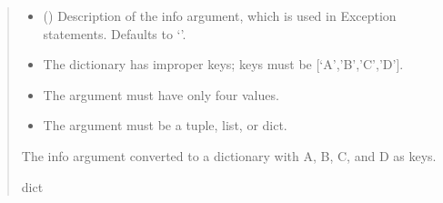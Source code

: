 \documentclass[letterpaper,10pt,english]{sphinxmanual}
\begin{document}
\begin{fulllineitems}
\begin{fulllineitems}
\begin{quote}
\begin{description}
\begin{itemize}
\item {} 
\sphinxAtStartPar
{} (\sphinxstyleliteralemphasis{\sphinxupquote{, }}) \textendash{} Description of the info argument, which is used in                 Exception statements. Defaults to ‘’.

\end{itemize}

\begin{itemize}
\item {} 
\sphinxAtStartPar
{} \textendash{} The dictionary has improper keys; keys must be {[}‘A’,’B’,’C’,’D’{]}.

\item {} 
\sphinxAtStartPar
{} \textendash{} The argument must have only four values.

\item {} 
\sphinxAtStartPar
{} \textendash{} The argument must be a tuple, list, or dict.

\end{itemize}

\sphinxAtStartPar
The info argument converted to a dictionary with A, B, C, and D as keys.

\sphinxAtStartPar
dict

\end{description}\end{quote}

\end{fulllineitems}



\end{fulllineitems}
\end{document}
